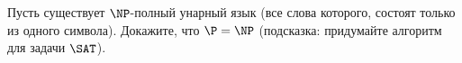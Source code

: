 Пусть существует $\NP$-полный унарный язык (все слова которого, состоят только из одного символа). Докажите, что $\P = \NP$
(подсказка: придумайте алгоритм для задачи $\SAT$).